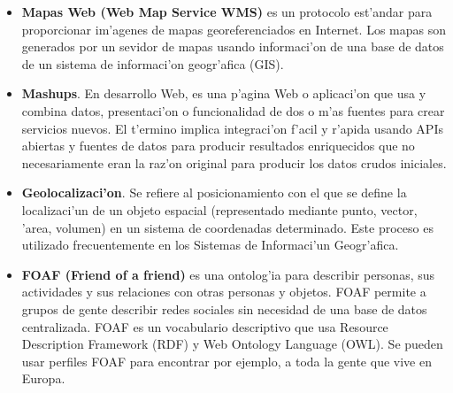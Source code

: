 \documentclass[11pt]{article}
\begin{document}
\begin{itemize}
\begin{verbatim}
\end{verbatim}
\item \textbf{Mapas Web (Web Map Service WMS)} es un protocolo est'andar para proporcionar im'agenes de mapas georeferenciados en Internet. Los mapas son generados por un sevidor de mapas usando informaci'on de una base de datos de un sistema de informaci'on geogr'afica (GIS).
\item \textbf{Mashups}. En desarrollo Web, es una p'agina Web o aplicaci'on que usa y combina datos, presentaci'on o funcionalidad de dos o m'as fuentes para crear servicios nuevos. El t'ermino implica integraci'on f'acil y r'apida usando APIs abiertas y fuentes de datos para producir resultados enriquecidos que no necesariamente eran la raz'on original para producir los datos crudos iniciales.
\item \textbf{Geolocalizaci'on}. Se refiere al posicionamiento con el que se define la localizaci'un de un objeto espacial (representado mediante punto, vector, 'area, volumen) en un sistema de coordenadas determinado. Este proceso es utilizado frecuentemente en los Sistemas de Informaci'un Geogr'afica.
\item \textbf{FOAF (Friend of a friend)} es una ontolog'ia para describir personas, sus actividades y sus relaciones con otras personas y objetos. FOAF permite a grupos de gente describir redes sociales sin necesidad de una base de datos centralizada. FOAF es un vocabulario descriptivo que usa Resource Description Framework (RDF) y Web Ontology Language (OWL). Se pueden usar perfiles FOAF para encontrar por ejemplo, a toda la gente que vive en Europa.
\end{itemize}

\newpage


\end{document}
